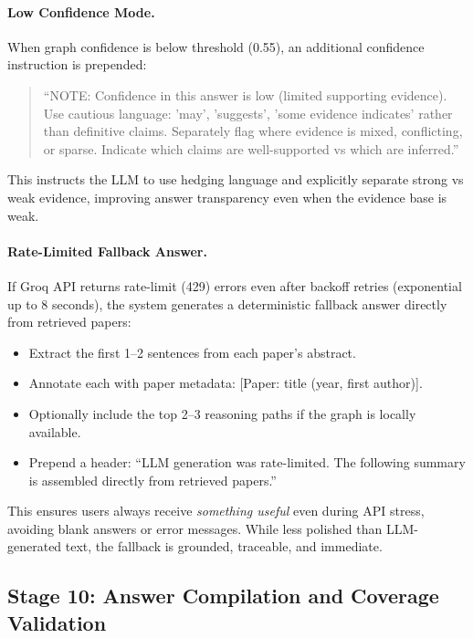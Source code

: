 \documentclass[11pt]{article}
\begin{document}
\paragraph{Low Confidence Mode.} When graph confidence is below threshold (0.55), an additional confidence instruction is prepended:
\begin{quote}
\small
``NOTE: Confidence in this answer is low (limited supporting evidence). Use cautious language: 'may', 'suggests', 'some evidence indicates' rather than definitive claims. Separately flag where evidence is mixed, conflicting, or sparse. Indicate which claims are well-supported vs which are inferred.''
\end{quote}
This instructs the LLM to use hedging language and explicitly separate strong vs weak evidence, improving answer transparency even when the evidence base is weak.

\paragraph{Rate-Limited Fallback Answer.} If Groq API returns rate-limit (429) errors even after backoff retries (exponential up to 8 seconds), the system generates a deterministic fallback answer directly from retrieved papers:
\begin{itemize}[leftmargin=1.2em]
  \item Extract the first 1--2 sentences from each paper's abstract.
  \item Annotate each with paper metadata: [Paper: title (year, first author)].
  \item Optionally include the top 2--3 reasoning paths if the graph is locally available.
  \item Prepend a header: ``LLM generation was rate-limited. The following summary is assembled directly from retrieved papers.''
\end{itemize}
This ensures users always receive \emph{something useful} even during API stress, avoiding blank answers or error messages. While less polished than LLM-generated text, the fallback is grounded, traceable, and immediate.

\subsection{Stage 10: Answer Compilation and Coverage Validation}
\end{document}
